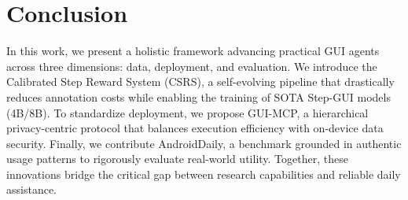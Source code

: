 \section{Conclusion}
In this work, we present a holistic framework advancing practical GUI agents across three dimensions: data, deployment, and evaluation. 
We introduce the Calibrated Step Reward System (CSRS), a self-evolving pipeline that drastically reduces annotation costs while enabling the training of SOTA Step-GUI models (4B/8B).
To standardize deployment, we propose GUI-MCP, a hierarchical privacy-centric protocol that balances execution efficiency with on-device data security. 
Finally, we contribute AndroidDaily, a benchmark grounded in authentic usage patterns to rigorously evaluate real-world utility.
Together, these innovations bridge the critical gap between research capabilities and reliable daily assistance.
